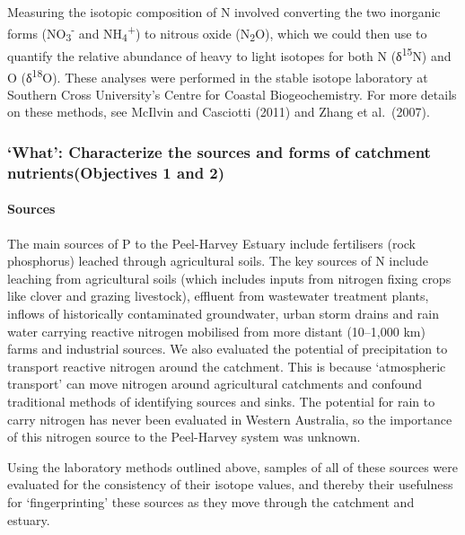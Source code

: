 \documentclass[
]{book}
\begin{document}
Measuring the isotopic composition of N involved converting the two inorganic forms (NO\textsubscript{3}\textsuperscript{-} and NH\textsubscript{4}\textsuperscript{+}) to nitrous oxide (N\textsubscript{2}O), which we could then use to quantify the relative abundance of heavy to light isotopes for both N (δ\textsuperscript{15}N) and O (δ\textsuperscript{18}O). These analyses were performed in the stable isotope laboratory at Southern Cross University's Centre for Coastal Biogeochemistry. For more details on these methods, see McIlvin and Casciotti (2011) and Zhang et al.~(2007).~

\hypertarget{what-characterize-the-sources-and-forms-of-catchment-nutrientsobjectives-1-and-2}{%
\subsubsection{`What': Characterize the sources and forms of catchment nutrients(Objectives 1 and 2)}\label{what-characterize-the-sources-and-forms-of-catchment-nutrientsobjectives-1-and-2}}

\hypertarget{sources}{%
\paragraph{Sources}\label{sources}}

The main sources of P to the Peel-Harvey Estuary include fertilisers (rock phosphorus) leached through agricultural soils. The key sources of N include leaching from agricultural soils (which includes inputs from nitrogen fixing crops like clover and grazing livestock), effluent from wastewater treatment plants, inflows of historically contaminated groundwater, urban storm drains and rain water carrying reactive nitrogen mobilised from more distant (10--1,000 km) farms and industrial sources. We also evaluated the potential of precipitation to transport reactive nitrogen around the catchment. This is because `atmospheric transport' can move nitrogen around agricultural catchments and confound traditional methods of identifying sources and sinks. The potential for rain to carry nitrogen has never been evaluated in Western Australia, so the importance of this nitrogen source to the Peel-Harvey system was unknown.

Using the laboratory methods outlined above, samples of all of these sources were evaluated for the consistency of their isotope values, and thereby their usefulness for `fingerprinting' these sources as they move through the catchment and estuary.~
\end{document}
